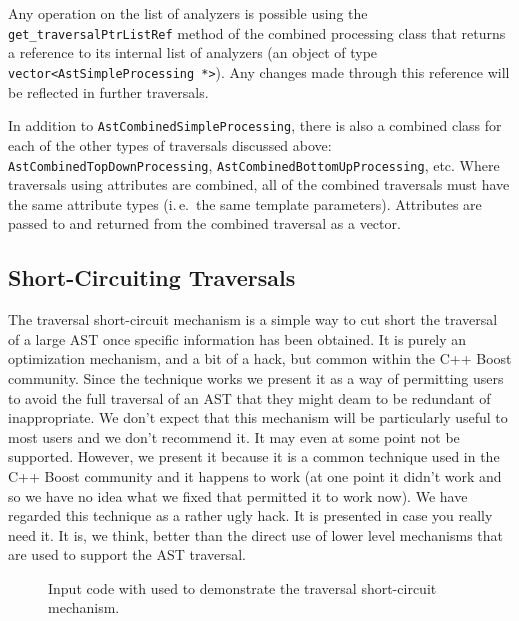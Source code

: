 Any operation on the list of analyzers is possible using the {\tt
get\_traversalPtrListRef} method of the combined processing class that returns
a reference to its internal list of analyzers (an object of type {\tt
vector<AstSimpleProcessing *>}). Any changes made through this reference will
be reflected in further traversals.

In addition to {\tt AstCombinedSimpleProcessing}, there is also a combined
class for each of the other types of traversals discussed above: {\tt
AstCombinedTopDownProcessing}, {\tt AstCombinedBottomUpProcessing}, etc. Where
traversals using attributes are combined, all of the combined traversals must
have the same attribute types (i.\,e.~the same template parameters). Attributes
are passed to and returned from the combined traversal as a vector.

\clearpage
\subsection{Short-Circuiting Traversals}

   The traversal short-circuit mechanism is a simple way to cut short
the traversal of a large AST once specific information has been obtained.
It is purely an optimization mechanism, and a bit of a hack, but common
within the C++ Boost community.  Since the technique works we present it
as a way of permitting users to avoid the full traversal of an AST
that they might deam to be redundant of inappropriate.  We don't
expect that this mechanism will be particularly useful to most users
and we don't recommend it.  It may even at some point not be supported.
However, we present it because it is a common technique used in the C++ 
Boost community and it happens to work (at one point it didn't work and
so we have no idea what we fixed that permitted it to work now).  We have
regarded this technique as a rather ugly hack.  It is presented in case
you really need it.  It is, we think, better than the direct use of lower
level mechanisms that are used to support the AST traversal.

\begin{figure}[!h]
{\indent
{\mySmallFontSize

\begin{latexonly}
   
\end{latexonly}

\begin{htmlonly}
   
\end{htmlonly}
}
}
\caption{Input code with used to demonstrate the traversal short-circuit mechanism.}
\label{Tutorial:exampleInputCode_ExampleLoopNestingInfoProcessing}
\end{figure}


